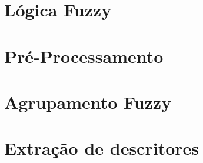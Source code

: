 \section{Lógica Fuzzy}
\section{Pré-Processamento}
\section{Agrupamento Fuzzy}
\section{Extração de descritores}
